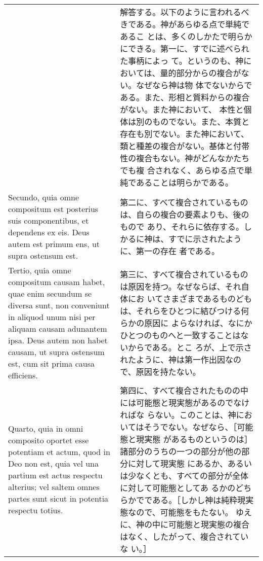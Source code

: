 \documentclass[10pt]{jsarticle}
\begin{document}
\begin{longtable}{p{21em}p{21em}}
&

解答する。以下のように言われるべきである。神があらゆる点で単純であるこ
とは、多くのしかたで明らかにできる。第一に、すでに述べられた事柄によっ
て。というのも、神においては、量的部分からの複合がない。なぜなら神は物
体でないからである。また、形相と質料からの複合がない。また神において、
本性と個体は別のものでない。また、本質と存在も別でない。また神において、
類と種差の複合がない。基体と付帯性の複合もない。神がどんなかたちでも複
合されなく、あらゆる点で単純であることは明らかである。

\\


Secundo, quia omne compositum est posterius suis componentibus, et
dependens ex eis. Deus autem est primum ens, ut supra ostensum est.

&

第二に、すべて複合されているものは、自らの複合の要素よりも、後のもので
あり、それらに依存する。しかるに神は、すでに示されたように、第一の存在
者である。

\\

Tertio, quia omne compositum causam habet, quae enim secundum se
diversa sunt, non conveniunt in aliquod unum nisi per aliquam causam
adunantem ipsa. Deus autem non habet causam, ut supra ostensum est,
cum sit prima causa efficiens.

&

第三に、すべて複合されているものは原因を持つ。なぜならば、それ自体にお
いてさまざまであるものどもは、それらをひとつに結びつける何らかの原因に
よらなければ、なにかひとつのものへと一致することはないからである。とこ
ろが、上で示されたように、神は第一作出因なので、原因を持たない。

\\

Quarto, quia in omni composito oportet esse potentiam et actum, quod
in Deo non est, quia vel una partium est actus respectu alterius; vel
saltem omnes partes sunt sicut in potentia respectu totius.

&

第四に、すべて複合されたものの中には可能態と現実態があるのでなければな
らない。このことは、神においてはそうでない。なぜなら、［可能態と現実態
があるものというのは］諸部分のうちの一つの部分が他の部分に対して現実態
にあるか、あるいは少なくとも、すべての部分が全体に対して可能態としてあ
るかのどちらかでである。［しかし神は純粋現実態なので、可能態をもたない。
ゆえに、神の中に可能態と現実態の複合はなく、したがって、複合されていな
い。］


\end{longtable}
\end{document}

